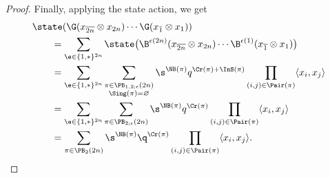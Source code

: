 \begin{proof}
 Finally, applying the state action, we get
\begin{align*}
&\state(\G(x_{\overline{ 2n}}\otimes x_{ 2n})\cdots \G(x_{\bar 1}\otimes x_{ 1}))
\\
&\qquad =\sum_{\e\in\{1,\ast\}^{2n}} \state\big( \B^{\epsilon(2n)}(x_{\overline{2n}}\otimes x_{2n})\cdots \B^{\epsilon(1)}(x_{\overline{1}}\otimes x_1)\big)
\\
&\qquad =\sum_{\e\in\{1,\ast\}^{2n}} \sum_{\substack{\pi\in\PB_{1,2;\epsilon}(2n)\\ \Sing(\pi)=\varnothing }} \s^{\NB(\pi)}q^{\Cr(\pi)+ \InS(\pi)}
\prod_{\substack{(i,j) \in \Pair(\pi)} }\langle x_i, x_j\rangle
\\
&\qquad =\sum_{\e\in\{1,\ast\}^{2n}} \sum_{\substack{\pi\in\PB_{2;\epsilon}(2n) }} \s^{\NB(\pi)}q^{\Cr(\pi)}
\prod_{\substack{(i,j) \in \Pair(\pi)} }\langle x_i, x_j\rangle
\\
&\qquad = \sum_{\pi\in\PB_{2}(2n)} \s^{\NB(\pi)}\q^{\Cr(\pi)} \prod_{\substack{(i,j) \in \Pair(\pi)} }\langle x_i, x_j\rangle.
\tag*{\qed}
\end{align*}
\renewcommand{\qed}{}
\end{proof}
